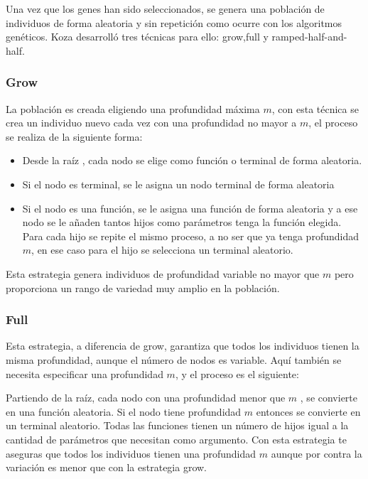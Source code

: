 \documentclass[12pt]{article} \usepackage[utf8x]{inputenc}
\begin{document}
Una vez que los genes han sido seleccionados, se genera una 
población de individuos de forma aleatoria y sin repetición 
como ocurre con los algoritmos genéticos. Koza desarrolló 
tres técnicas para ello: grow,full y ramped-half-and-half.


\subsubsection{Grow}

La población es creada eligiendo una profundidad máxima \(m\),
con esta técnica se crea un individuo nuevo cada vez con una
profundidad no mayor a \(m\),
el proceso se realiza de la siguiente forma:
\begin{itemize}
\item Desde la raíz , cada nodo se elige como función o terminal de
  forma aleatoria.
\item Si el nodo es terminal, se le asigna un nodo terminal de forma
  aleatoria
\item Si el nodo es una función, se le asigna una función de forma
  aleatoria y a ese nodo se le añaden tantos hijos como parámetros
  tenga la función elegida. Para cada hijo se repite el mismo proceso,
  a no ser que ya tenga profundidad \(m\),
  en ese caso para el hijo se selecciona un terminal aleatorio.
\end{itemize}

Esta estrategia genera individuos de profundidad variable no mayor que
\(m\) pero proporciona un rango de variedad muy amplio en la población.

\subsubsection{Full}

Esta estrategia, a diferencia de grow, garantiza que todos los
individuos tienen la misma profundidad, aunque el número de nodos es
variable. Aquí también se necesita especificar una profundidad \(m\),
y el proceso es el siguiente:

Partiendo de la raíz, cada nodo con una profundidad menor que \(m\)
, se convierte en una función aleatoria. Si el nodo tiene profundidad
\(m\) entonces se convierte en un terminal aleatorio. Todas las funciones 
tienen un número de hijos igual a la cantidad de parámetros que necesitan 
como argumento. Con esta estrategia te aseguras que todos los individuos 
tienen una profundidad \(m\) aunque por contra la variación es menor 
que con la estrategia grow.\\
\end{document}
